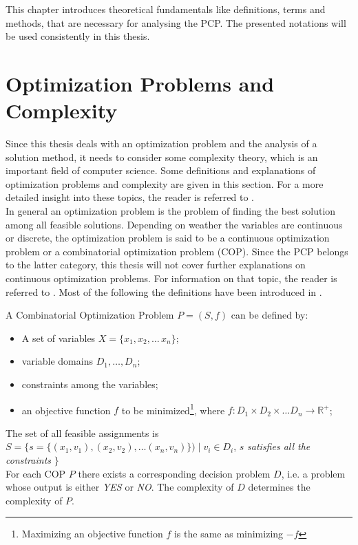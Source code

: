 This chapter introduces theoretical fundamentals like definitions, terms and methods, that are necessary for analysing the PCP. The presented notations will be used consistently in this thesis. 
\section{Optimization Problems and Complexity}
Since this thesis deals with an optimization problem and the analysis of a solution method, it needs to consider some complexity theory, which is an important field of computer science. Some definitions and explanations of optimization problems and complexity are given in this section.
For a more detailed insight into these topics, the reader is referred to \cite{lawler-01,papadimitriou-94,garey-79}.\\
In general an optimization problem is the problem of finding the best solution among all feasible solutions. Depending on weather the variables are continuous or discrete, the optimization problem is said to be a continuous optimization problem or a combinatorial optimization problem (COP). Since the PCP belongs to the latter category, this thesis will not cover further explanations on continuous optimization problems. For information on that topic, the reader is referred to \cite{nocedal-00, pardalos-02}. Most of the following the definitions have been introduced in \cite{blum-05, neumann-10}.
\begin{definition}
A Combinatorial Optimization Problem $P = (S, f)$ can be defined by: 
\begin{itemize}
\item A set of variables $X=\{x_1,x_2,\ldots \,x_n\}$;
\item variable domains $D_1,\ldots , D_n$;
\item constraints among the variables;
\item an objective function $f$ to be minimized\footnote[1]{Maximizing an objective function $f$ is the same as minimizing $- f$}, where $f : D_1 \times D_2 \times \ldots D_n \rightarrow \mathbb{R}^+$;
\end{itemize}
\end{definition}
The set of all feasible assignments is $S = \{s=\{(x_1,v_1),(x_2,v_2),\ldots (x_n,v_n)\}) \mid v_i \in D_i$, $s$ \textit{satisfies all the constraints} $\}$\\
For each COP $P$ there exists a corresponding decision problem $D$, i.e. a problem whose output is either \textit{YES} or \textit{NO}. The complexity of $D$ determines the complexity of $P$.
